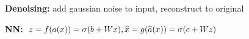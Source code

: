 \textbf{Denoising:} add gaussian noise to input, reconstruct to original\\

\textbf{NN:} $z = f(a(x)) = \sigma(b + Wx), \widehat{x} = g(\widehat{a} (x)) = \sigma(c + Wz)$\\


